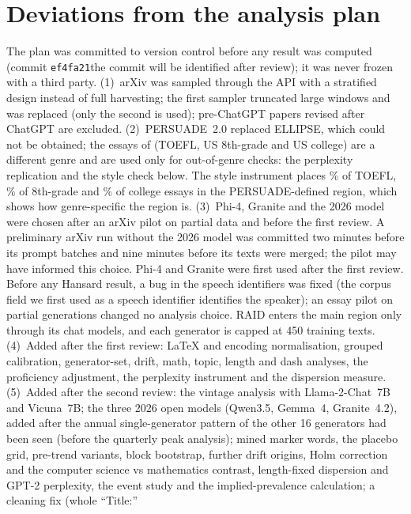 \documentclass[11pt]{article}
\newcommand{\gptii}{\mbox{GPT-2}}
\begin{document}
\section{Deviations from the analysis plan}
\label{app:deviations}
The plan was committed to version control before any result was computed (\ifdefined\PREPRINT commit
\texttt{ef4fa21}\else the commit will be identified after review\fi); it was never frozen with a third party. (1)~arXiv was sampled through the API with a stratified design instead of full harvesting; the first
sampler truncated large windows and was replaced (only the second is used); pre-ChatGPT papers revised after
ChatGPT are excluded. (2)~PERSUADE~2.0 replaced ELLIPSE, which could
not be obtained; the essays of \citet{liang2023detectors} (TOEFL, US 8th-grade and US college) are a different
genre and are used only for out-of-genre checks: the perplexity replication and the style check below. The style instrument places
\% of TOEFL, \% of 8th-grade and
\% of college essays in the PERSUADE-defined region, which shows how
genre-specific the region is. (3)~Phi-4, Granite and the 2026 model were chosen after an arXiv pilot on partial data and before the first review. A preliminary arXiv run without the 2026 model was committed two minutes before its prompt batches and nine
minutes before its texts were merged; the pilot may have informed this choice. Phi-4 and Granite were first used
after the first review. Before any Hansard result, a bug in the speech identifiers was fixed (the corpus field we first used as a speech identifier identifies the speaker); an essay pilot on partial generations changed no analysis choice. RAID enters
the main region only through its chat models, and each generator is capped at 450 training texts.
(4)~Added after the first review: LaTeX and encoding normalisation, grouped calibration, generator-set, drift, math, topic, length and dash analyses, the proficiency
adjustment, the perplexity instrument and the dispersion measure. (5)~Added after the second review: the vintage
analysis with Llama-2-Chat~7B and Vicuna~7B; the three 2026 open models (Qwen3.5, Gemma~4, Granite~4.2), added
after the annual single-generator pattern of the other 16 generators had been seen (before the quarterly peak analysis); mined marker words, the placebo grid, pre-trend variants, block
bootstrap, further drift origins, Holm correction and the computer science vs mathematics contrast,
length-fixed dispersion and
\gptii{} perplexity, the event study and the implied-prevalence calculation; a cleaning fix (whole ``Title:''
\end{document}
